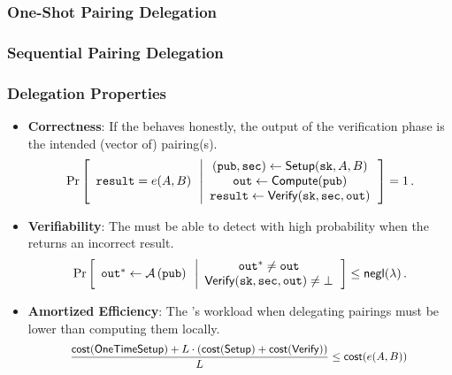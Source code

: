 \documentclass{beamer}
\begin{document}
\begin{frame}
    \frametitle{One-Shot Pairing Delegation}
    
\end{frame}

\begin{frame}
    \frametitle{Sequential Pairing Delegation}
    
\end{frame}

\begin{frame}
    \frametitle{Delegation Properties}
\small
    \begin{itemize}
    \pause
	\item \textbf{Correctness}: If the \server behaves honestly, the output of the verification phase is the intended (vector of) pairing(s).	
\[	 
\mathrm{Pr}\left[{\begin{array}{c}{\ensuremath{\tt result}}=e(A,B)\end{array}} \left| \begin{array}{c} 	({\tt pub}, {\tt sec})\gets{\sf Setup}({\tt sk}, {A},{B})\\
		 		{\tt out}\gets{\sf Compute}({\tt pub})\\
		 		{\tt result}\gets{\sf Verify}({\tt sk},{\tt sec},{\tt out}) \end{array}\right. \right]=1\,.
\]
\pause
	\item \textbf{Verifiability}: The \client must be able to detect with high probability when the \server returns an incorrect result.
\[	 
\mathrm{Pr}\left[{\begin{array}{c}{\ensuremath{{\tt out}}}^*\gets\mathcal{A}\left({\tt pub}\right)\end{array}} \left| \begin{array}{c} 
		 		{\ensuremath{{\tt out}}}^*\neq{\tt out}\\
		 		{\sf Verify}({\tt sk},{\tt sec},{\tt out})\neq\bot \end{array}\right. \right]\leq{\sf negl}({\lambda})\,.
\]
\pause
	\item \textbf{Amortized Efficiency}: The \client's workload when delegating \totpairings pairings must be lower than computing them locally.
    \[
    \scalebox{0.9}{$\displaystyle
        \frac{\cost(\offsetup)+\totpairings\cdot\paren{\cost(\onsetup) + \cost(\onverify)}}{\totpairings}
        \leq \cost(e(A,B))$
    }
    \]
    \end{itemize}
\end{frame}
\end{document}
